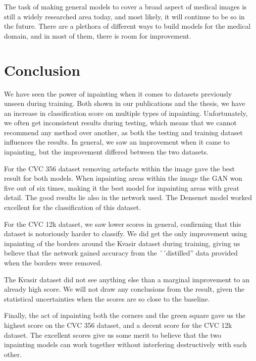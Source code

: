 The task of making general models to cover a broad aspect of medical images is still a widely researched area today, and most likely, it will continue to be so in the future. There are a  plethora of different ways to build models for the medical domain, and in most of them, there is room for improvement.

\section{Conclusion}
We have seen the power of inpainting when it comes to datasets previously unseen during training. Both shown in our publications and the thesis, we have an increase in classification score on multiple types of inpainting.
Unfortunately, we often get inconsistent results during testing, which means that we cannot recommend any method over another, as both the testing and training dataset influences the results.
In general, we saw an improvement when it came to inpainting, but the improvement differed between the two datasets. 

For the CVC 356 dataset removing artefacts within the image gave the best result for both models. When inpainting areas within the image the GAN won five out of six times, making it the best model for inpainting  areas with great detail. The good results lie also in the network used. The Densenet model worked excellent for the classification of this dataset.


For the CVC 12k dataset, we saw lower scores in general, confirming that this dataset is notoriously harder to classify. We did get the only improvement using inpainting of the borders around the Kvasir dataset during training, giving us believe that the network gained accuracy from the ´´distilled'' data provided when the borders were removed. 

The Kvasir dataset did not see anything else than a marginal improvement to an already high score. We will not draw any conclusions from the result, given the statistical uncertainties when the scores are so close to the baseline.


Finally, the act of inpainting both the corners and the green square gave us the highest score on the CVC 356 dataset, and a decent score for the CVC 12k dataset. The excellent scores give us some merit to believe that the two inpainting models can work together without interfering destructively with each other. 

\vspace{5px}

